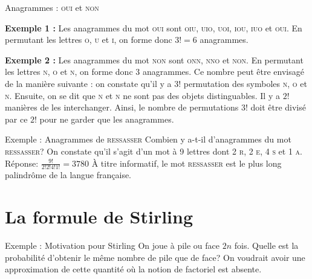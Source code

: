 \documentclass[nuit,charter,pied]{BeamerJS}
\begin{document}
\begin{frame}{Anagrammes : \textsc{oui} et \textsc{non}}
\begin{exs}
\textbf{Exemple 1 :} Les anagrammes du mot \textsc{oui} sont \textsc{oiu}, \textsc{uio}, \textsc{uoi}, \textsc{iou}, \textsc{iuo} et \textsc{oui}. En permutant les lettres \textsc{o}, \textsc{u} et \textsc{i}, on forme donc \(3!=6\) anagrammes.

\medskip
\pause
\textbf{Exemple 2 :} Les anagrammes du mot \textsc{non} sont \textsc{onn}, \textsc{nno} et \textsc{non}. En permutant les lettres \textsc{n}, \textsc{o} et \textsc{n}, on forme donc \(3\) anagrammes. Ce nombre peut être envisagé de la manière suivante : on constate qu'il y a \(3!\) permutation des symboles {\color{Dominante}\textsc{n}}, \textsc{o} et {\color{Accent}\textsc{n}}. Ensuite, on se dit que {\color{Dominante}\textsc{n}} et {\color{Accent}\textsc{n}} ne sont pas des objets distinguables. Il y a \(2!\) manières de les interchanger. Ainsi, le nombre de permutations \(3!\) doit être divisé par ce \(2!\) pour ne garder que les anagrammes.
\end{exs}
\end{frame}

\begin{frame}{Exemple : Anagrammes de \textsc{ressasser}}
	Combien y a-t-il d'anagrammes du mot \textsc{ressasser}? On constate qu'il s'agit d'un mot à 9 lettres dont 2 \textsc{r}, 2 \textsc{e}, 4 \textsc{s} et 1 \textsc{a}.
	\vfill
	\pause
	{\color{black!60}Réponse: \(\frac{9!}{2!2!4!1!}=\num{3780}\)}
	\vfill
	\pause
	À titre informatif, le mot \textsc{ressasser} est le plus long palindrôme de la langue française.
\end{frame}

\section{La formule de Stirling}

\begin{frame}{Exemple : Motivation pour Stirling}
	On joue à pile ou face $2n$ fois. Quelle est la probabilité d'obtenir le même nombre de pile que de face?
	\vfill
	\pause
	On voudrait avoir une approximation de cette quantité où la notion de factoriel est absente.
\end{frame}
\end{document}
